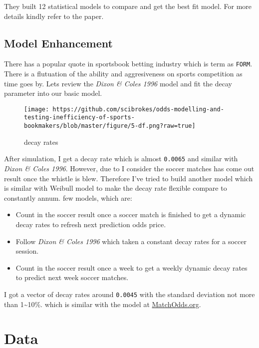 \documentclass[article]{jss}
\providecommand{\tightlist}{%
  \setlength{\itemsep}{0pt}\setlength{\parskip}{0pt}}
\begin{document}
They built 12 statistical models to compare and get the best fit model.
For more details kindly refer to the paper.

\hypertarget{model-enhancement}{\subsection{Model
Enhancement}\label{model-enhancement}}

There has a popular quote in sportsbook betting industry which is term
as \texttt{FORM}. There is a flutuation of the ability and aggresiveness
on sports competition as time goes by. Lets review the \emph{Dixon \&
Coles 1996} model and fit the decay parameter into our basic model.
\bigbreak

\begin{figure}[htbp]
\centering
\texttt{[image: https://github.com/scibrokes/odds-modelling-and-testing-inefficiency-of-sports-bookmakers/blob/master/figure/5-df.png?raw=true]}
\caption{decay rates}
\end{figure}

After simulation, I get a decay rate which is almost \texttt{0.0065} and
similar with \emph{Dixon \& Coles 1996}. However, due to I consider the
soccer matches has come out result once the whistle is blew. Therefore
I've tried to build another model which is similar with Weibull model to
make the decay rate flexible compare to constantly annum. few models,
which are: \bigbreak

\begin{itemize}
\tightlist
\item
  Count in the soccer result once a soccer match is finished to get a
  dynamic decay rates to refresh next prediction odds price.
\item
  Follow \emph{Dixon \& Coles 1996} which taken a constant decay rates
  for a soccer session.
\item
  Count in the soccer result once a week to get a weekly dynamic decay
  rates to predict next week soccer matches.
\end{itemize}

I got a vector of decay rates around \texttt{0.0045} with the standard
deviation not more than 1\textasciitilde{}10\%. which is similar with
the model at \href{http://matchodds.org}{MatchOdds.org}.

\section{Data}\label{data}
\end{document}
